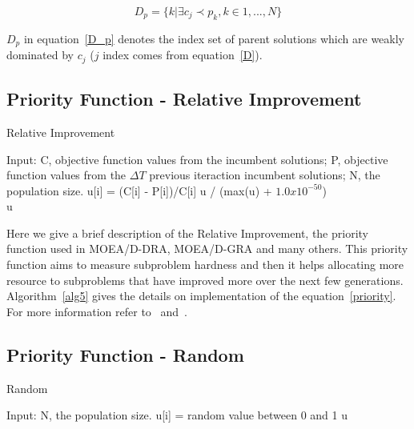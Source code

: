 \begin{equation}
\label{D_p}
D_p = \{k| \exists c_j \prec p_k, k \in {1,..., N}\}
\end{equation}

$D_p$ in equation~\ref{D_p} denotes the index set of parent solutions which are weakly dominated by $c_j$ ($j$ index comes from equation~\ref{D}).



\subsection{Priority Function - Relative Improvement}  

\begin{algorithm}[t]
	\caption{Relative Improvement}\label{alg5}
	\begin{algorithmic}[1]
		
		\State Input:  C, objective function values from the incumbent solutions; P, objective function values from the $\Delta T$ previous iteraction incumbent solutions; N, the population size.
		\State u[i] = (C[i] - P[i])/C[i]
		\EndFor
		u / (max(u) + $1.0 x 10^{-50}$)\\
		\Return u
	\end{algorithmic}
\end{algorithm}

Here we give a brief description of the Relative Improvement, the priority function used in MOEA/D-DRA, MOEA/D-GRA and many others. This priority function aims to measure subproblem hardness and then it helps allocating more resource to subproblems that have  improved more over the next few generations. Algorithm~\ref{alg5} gives the details on implementation of the equation~\ref{priority}.  For more information refer to~\cite{zhang2009performance} and~\cite{zhou2016all}.
%
%
\subsection{Priority Function - Random}

\begin{algorithm}[t]
	\caption{Random}\label{alg4}
	\begin{algorithmic}[1]
		
		\State Input:  N, the population size.
		\For {i=1 to N}
		\State u[i] = random value between 0 and 1
		\EndFor
		\Return u
	\end{algorithmic}
\end{algorithm}

